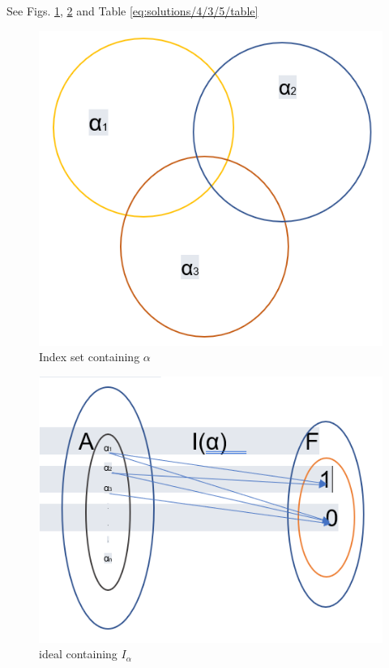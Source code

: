 See Figs. \ref{eq:solutions/4/3/5/fig0}, \ref{eq:solutions/4/3/5/fig1} and Table \ref{eq:solutions/4/3/5/table}



\begin{figure}[h!]
\centering
\includegraphics[width=\columnwidth]{solutions/4/3/5/index_set.png}
\caption{Index set containing $\alpha$}
\label{eq:solutions/4/3/5/fig0}
\end{figure}
\begin{figure}[h!]
\centering
\includegraphics[width=\columnwidth]{solutions/4/3/5/ideal.png}
\caption{ideal containing $I_{\alpha}$ }
\label{eq:solutions/4/3/5/fig1}
\end{figure}

